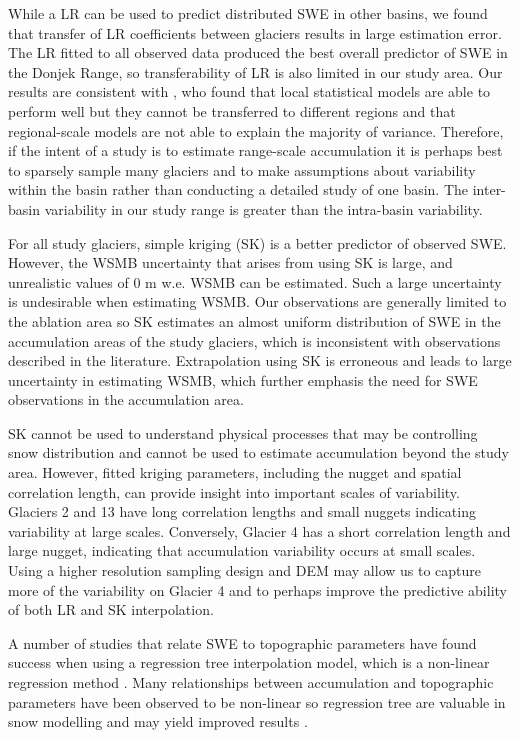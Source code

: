 \documentclass[twocolumn,letterpaper]{igs}
\begin{document}
While a LR can be used to predict distributed SWE in other basins, we found that transfer of LR coefficients between glaciers results in large estimation error. The LR fitted to all observed data produced the best overall predictor of SWE in the Donjek Range, so transferability of LR is also limited in our study area. Our results are consistent with \cite{Grunewald2013}, who found that local statistical models are able to perform well but  they cannot be transferred to different regions and that regional-scale models are not able to explain the majority of variance. Therefore, if the intent of a study is to estimate range-scale accumulation it is perhaps best to sparsely sample many glaciers and to make assumptions about variability within the basin rather than conducting a detailed study of one basin. The inter-basin variability in our study range is greater than the intra-basin variability. 

For all study glaciers, simple kriging (SK) is a better predictor of observed SWE. However, the WSMB uncertainty that arises from using SK is large, and unrealistic values of 0 m w.e. WSMB can be estimated. Such a large uncertainty is undesirable when estimating WSMB.  Our observations are generally limited to the ablation area so SK estimates an almost uniform distribution of SWE in the accumulation areas of the study glaciers, which is inconsistent with observations described in the literature. Extrapolation using SK is erroneous and leads to large uncertainty in estimating WSMB, which further emphasis the need for SWE observations in the accumulation area. 

SK cannot be used to understand physical processes that may be controlling snow distribution and cannot be used to estimate accumulation beyond the study area. However, fitted kriging parameters, including the nugget and spatial correlation length, can provide insight into important scales of variability. Glaciers 2 and 13 have long correlation lengths and small nuggets indicating variability at large scales. Conversely, Glacier 4 has a short correlation length and large nugget, indicating that accumulation variability occurs at small scales. Using a higher resolution sampling design and DEM may allow us to capture more of the variability on Glacier 4 and to perhaps improve the predictive ability of both LR and SK interpolation. 

A number of studies that relate SWE to topographic parameters have found success when using a regression tree interpolation model, which is a non-linear regression method \citep[e.g.][]{Elder1998, Erickson2005, Lopez2010}. Many relationships between accumulation and topographic parameters have been observed to be non-linear so regression tree are valuable in snow modelling and may yield improved results \citep{Erxleben2002, Molotch2005}. 
\end{document}
